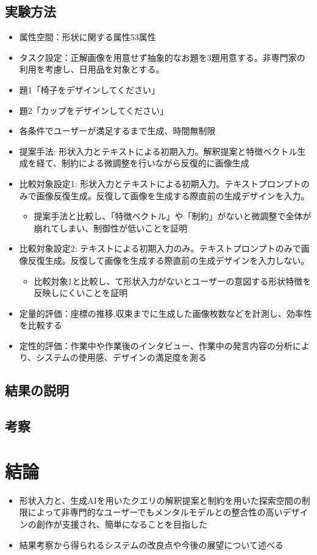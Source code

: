\documentclass[dvipdfmx]{jlreq}
\begin{document}
\subsection{実験方法}
\begin{itemize}
  \item 属性空間：形状に関する属性53属性
  \item タスク設定：正解画像を用意せず抽象的なお題を3題用意する。非専門家の利用を考慮し、日用品を対象とする。
  \item 題1「椅子をデザインしてください」
  \item 題2「カップをデザインしてください」
  \item 各条件でユーザーが満足するまで生成、時間無制限
  \item 提案手法: 形状入力とテキストによる初期入力。解釈提案と特徴ベクトル生成を経て、制約による微調整を行いながら反復的に画像生成
  \item 比較対象設定1: 形状入力とテキストによる初期入力。テキストプロンプトのみで画像反復生成。反復して画像を生成する際直前の生成デザインを入力。
  \begin{itemize}
  \item 提案手法と比較し、「特徴ベクトル」や「制約」がないと微調整で全体が崩れてしまい、制御性が低いことを証明
  \end{itemize}
  \item 比較対象設定2: テキストによる初期入力のみ。テキストプロンプトのみで画像反復生成。反復して画像を生成する際直前の生成デザインを入力しない。
  \begin{itemize}
  \item 比較対象1と比較し、て形状入力がないとユーザーの意図する形状特徴を反映しにくいことを証明
  \end{itemize}
  \item 定量的評価：座標の推移,収束までに生成した画像枚数などを計測し、効率性を比較する
  \item 定性的評価：作業中や作業後のインタビュー、作業中の発言内容の分析により、システムの使用感、デザインの満足度を測る
\end{itemize}
\subsection{結果の説明}
\subsection{考察}




\section{結論}
\begin{itemize}
  \item 形状入力と、生成AIを用いたクエリの解釈提案と制約を用いた探索空間の制限によって非専門的なユーザーでもメンタルモデルとの整合性の高いデザインの創作が支援され、簡単になることを目指した
  \item 結果考察から得られるシステムの改良点や今後の展望について述べる
\end{itemize}
\end{document}
